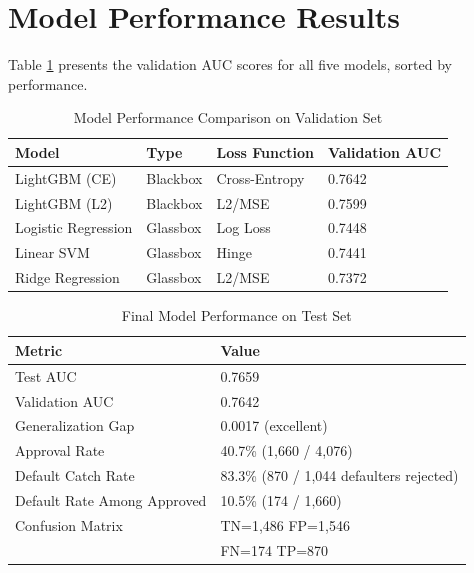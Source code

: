 \documentclass[12pt]{article}
\begin{document}
\newpage
\appendix

\section{Model Performance Results}\label{app:model_results}

Table \ref{tab:model_comparison} presents the validation AUC scores for all five models, sorted by performance.

\begin{table}[H]
\centering
\caption{Model Performance Comparison on Validation Set}
\label{tab:model_comparison}
\begin{tabular}{llll}
\toprule
\textbf{Model} & \textbf{Type} & \textbf{Loss Function} & \textbf{Validation AUC} \\
\midrule
LightGBM (CE) & Blackbox & Cross-Entropy & 0.7642 \\
LightGBM (L2) & Blackbox & L2/MSE & 0.7599 \\
Logistic Regression & Glassbox & Log Loss & 0.7448 \\
Linear SVM & Glassbox & Hinge & 0.7441 \\
Ridge Regression & Glassbox & L2/MSE & 0.7372 \\
\bottomrule
\end{tabular}
\end{table}

\begin{table}[H]
\centering
\caption{Final Model Performance on Test Set}
\label{tab:test_performance}
\begin{tabular}{ll}
\toprule
\textbf{Metric} & \textbf{Value} \\
\midrule
Test AUC & 0.7659 \\
Validation AUC & 0.7642 \\
Generalization Gap & 0.0017 (excellent) \\
\midrule
Approval Rate & 40.7\% (1,660 / 4,076) \\
Default Catch Rate & 83.3\% (870 / 1,044 defaulters rejected) \\
Default Rate Among Approved & 10.5\% (174 / 1,660) \\
\midrule
Confusion Matrix & TN=1,486  FP=1,546 \\
& FN=174  TP=870 \\
\bottomrule
\end{tabular}
\end{table}
\end{document}
